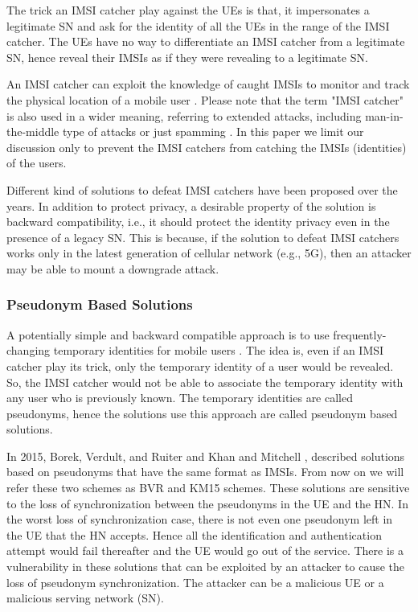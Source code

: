 \documentclass{llncs} %
\begin{document}
The trick an IMSI catcher play against the UEs is that, it impersonates a legitimate SN and ask for the identity of all the UEs in the range of the IMSI catcher. The UEs have no way to differentiate an IMSI catcher from a legitimate SN, hence reveal their IMSIs as if they were revealing to a legitimate SN. 

An IMSI catcher can exploit the knowledge of caught IMSIs to monitor and track the physical location of a mobile user \cite{tracking_bins,goldman2007mobile}. Please note that the term "IMSI catcher" is also used in a wider meaning, referring to extended attacks, including man-in-the-middle type of attacks or just spamming \cite{catch_me_if_you_can,chinese_spam}. In this paper we limit our discussion only to prevent the IMSI catchers from catching the IMSIs (identities) of the users.

Different kind of solutions to defeat IMSI catchers have been proposed over the years. In addition to protect privacy, a desirable property of the solution is backward compatibility, i.e., it should protect the identity privacy even in the presence of a legacy SN. This is because, if the solution to defeat IMSI catchers works only in the latest generation of cellular network (e.g., 5G), then an attacker may be able to mount a downgrade attack. 

\subsubsection{Pseudonym Based Solutions}
A potentially simple and backward compatible approach is to use frequently-changing temporary identities for mobile users \cite{CCS15,SSR15,Ginzboorg_Niemi_2016,Norrman_Naslund_Dubrova_2016,yemen2017}. The idea is, even if an IMSI catcher play its trick, only the temporary identity of a user would be revealed. So, the IMSI catcher would not be able to associate the temporary identity with any user who is previously known. The temporary identities are called pseudonyms, hence the solutions use this approach are called pseudonym based solutions. 

In 2015, Borek, Verdult, and Ruiter \cite{CCS15} and Khan and Mitchell \cite{SSR15}, described solutions based on pseudonyms that have the same format as IMSIs. From now on we will refer these two schemes as BVR and KM15 schemes. These solutions are sensitive to the loss of synchronization between the pseudonyms in the UE and the HN. In the worst loss of synchronization case, there is not even one pseudonym left in the UE that the HN accepts. Hence all the identification and authentication attempt would fail thereafter and the UE would go out of the service. There is a vulnerability in these solutions that can be exploited by an attacker to cause the loss of pseudonym synchronization. The attacker can be a malicious UE or a malicious serving network (SN).
\end{document}
